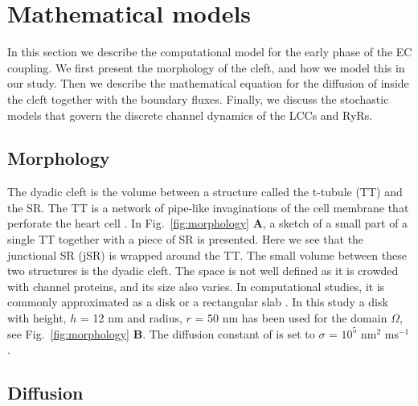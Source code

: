 \section{Mathematical models}
\label{sec:mathematical-models}
In this section we describe the computational model for the early phase of the EC coupling. We first present the morphology of the cleft, and how we model this in our study. Then we describe the mathematical equation for the diffusion of \Ca inside the cleft together with the boundary fluxes. Finally, we discuss the stochastic models that govern the discrete channel dynamics of the LCCs and RyRs.\par

\subsection*{Morphology}
\label{sec:morphology}
The dyadic cleft is the volume between a structure called the t-tubule (TT) and the SR. The TT is a network of pipe-like invaginations of the cell membrane that perforate the heart cell \cite{SoellerCannell1999}. In Fig.~\ref{fig:morphology} \textbf{A}, a sketch of a small part of a single TT together with a piece of SR is presented. Here we see that the junctional SR (jSR) is wrapped around the TT. The small volume between these two structures is the dyadic cleft. The space is not well defined as it is crowded with channel proteins, and its size also varies. In computational studies, it is commonly approximated as a disk or a rectangular slab \cite{PeskoffPostEtAl1992,SoellerCannell1997,KohSrinivasanEtAl2006,TanskanenGreensteinEtAl2007}. In this study a disk with height, $h$ = 12 nm and radius, $r$ = 50 nm has been used for the domain $\Omega$, see Fig.~\ref{fig:morphology} \textbf{B}. The diffusion constant of \Ca is set to $\sigma$ = $10^5$ nm$^2$ ms$^{-1}$ \cite{LangerPeskoff1996}.\par

\subsection*{\Ca Diffusion}
\label{sec:ca-diffusion}

